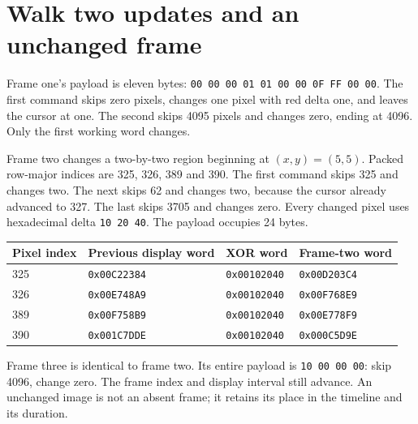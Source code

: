 \section{Walk two updates and an unchanged frame}
Frame one's payload is eleven bytes:
\texttt{00 00 00 01 01 00 00 0F FF 00 00}. The first command skips zero pixels,
changes one pixel with red delta one, and leaves the cursor at one. The second skips
4095 pixels and changes zero, ending at 4096. Only the first working word changes.

Frame two changes a two-by-two region beginning at $(x,y)=(5,5)$. Packed row-major
indices are 325, 326, 389 and 390. The first command skips 325 and changes two. The
next skips 62 and changes two, because the cursor already advanced to 327. The last
skips 3705 and changes zero. Every changed pixel uses hexadecimal delta
\texttt{10 20 40}. The payload occupies 24 bytes.
\begin{longtable}{p{19mm}p{42mm}p{34mm}p{42mm}}
\toprule Pixel index & Previous display word & XOR word & Frame-two word \\\midrule
325 & \texttt{0x00C22384} & \texttt{0x00102040} & \texttt{0x00D203C4} \\
326 & \texttt{0x00E748A9} & \texttt{0x00102040} & \texttt{0x00F768E9} \\
389 & \texttt{0x00F758B9} & \texttt{0x00102040} & \texttt{0x00E778F9} \\
390 & \texttt{0x001C7DDE} & \texttt{0x00102040} & \texttt{0x000C5D9E} \\\bottomrule
\end{longtable}
Frame three is identical to frame two. Its entire payload is
\texttt{10 00 00 00}: skip 4096, change zero. The frame index and display interval
still advance. An unchanged image is not an absent frame; it retains its place in
the timeline and its duration.
